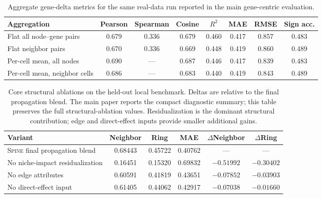 \documentclass[sigconf,review,balance=false]{acmart}
\newcommand{\methodname}{\textsc{Spine}\xspace}
\begin{document}
\begin{table}[t]
\centering
\caption{Aggregate gene-delta metrics for the same real-data run reported in the main gene-centric evaluation.}
\label{tab:app_gene_delta_metrics}
\small
\setlength{\tabcolsep}{5pt}
\renewcommand{\arraystretch}{1.12}
\begin{tabular}{lccccccc}
\toprule
Aggregation & Pearson & Spearman & Cosine & $R^2$ & MAE & RMSE & Sign acc. \\
\midrule
Flat all node--gene pairs & 0.679 & 0.336 & 0.679 & 0.460 & 0.417 & 0.857 & 0.483 \\
Flat neighbor pairs & 0.670 & 0.336 & 0.669 & 0.448 & 0.419 & 0.860 & 0.489 \\
Per-cell mean, all nodes & 0.690 & --- & 0.687 & 0.446 & 0.417 & 0.839 & 0.483 \\
Per-cell mean, neighbor cells & 0.686 & --- & 0.683 & 0.440 & 0.419 & 0.843 & 0.489 \\
\bottomrule
\end{tabular}
\end{table}

\begin{table}[t]
\centering
\caption{Core structural ablations on the held-out local benchmark. Deltas are relative to the final propagation blend. The main paper reports the compact diagnostic summary; this table preserves the full structural-ablation values. Residualization is the dominant structural contribution; edge and direct-effect inputs provide smaller additional gains.}
\label{tab:app_core_structural_ablations}
\small
\setlength{\tabcolsep}{5pt}
\renewcommand{\arraystretch}{1.12}
\begin{tabularx}{\textwidth}{@{}>{\raggedright\arraybackslash}Xccccc@{}}
\toprule
Variant & Neighbor & Ring & MAE & $\Delta$Neighbor & $\Delta$Ring \\
\midrule
\rowcolor{cyan!10}
\methodname{} final propagation blend &
0.68443 & 0.45722 & 0.40762 & --- & --- \\

No niche-impact residualization &
0.16451 & 0.15320 & 0.69832 & $-0.51992$ & $-0.30402$ \\

No edge attributes &
0.60591 & 0.41819 & 0.43651 & $-0.07852$ & $-0.03903$ \\

No direct-effect input &
0.61405 & 0.44062 & 0.42917 & $-0.07038$ & $-0.01660$ \\
\bottomrule
\end{tabularx}
\end{table}
\end{document}
